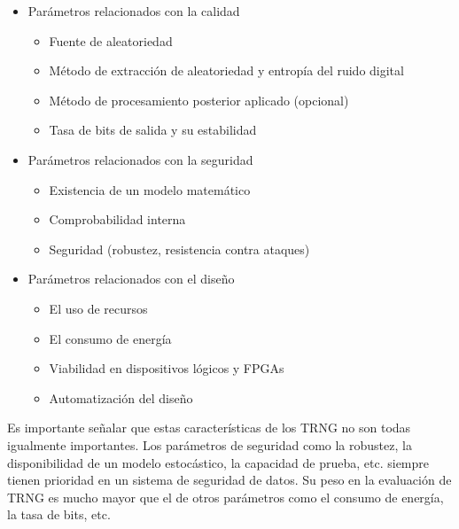 			\begin{itemize}
				\item Parámetros relacionados con la calidad
					\begin{itemize}
						\item Fuente de aleatoriedad
						\item Método de extracción de aleatoriedad y entropía del ruido digital
						\item Método de procesamiento posterior aplicado (opcional)
						\item Tasa de bits de salida y su estabilidad
					\end{itemize}
				\item Parámetros relacionados con la seguridad
					\begin{itemize}
						\item Existencia de un modelo matemático
						\item Comprobabilidad interna
						\item Seguridad (robustez, resistencia contra ataques)
					\end{itemize}
				\item Parámetros relacionados con el diseño
					\begin{itemize}
						\item El uso de recursos
						\item El consumo de energía
						\item Viabilidad en dispositivos lógicos y FPGAs
						\item Automatización del diseño
					\end{itemize}
			\end{itemize}
			
			Es importante señalar que estas características de los TRNG no son todas igualmente importantes. Los parámetros de seguridad como la robustez, la disponibilidad de un modelo estocástico, la capacidad de prueba, etc. siempre tienen prioridad en un sistema de seguridad de datos. Su peso en la evaluación de TRNG es mucho mayor que el de otros parámetros como el consumo de energía, la tasa de bits, etc.
			
